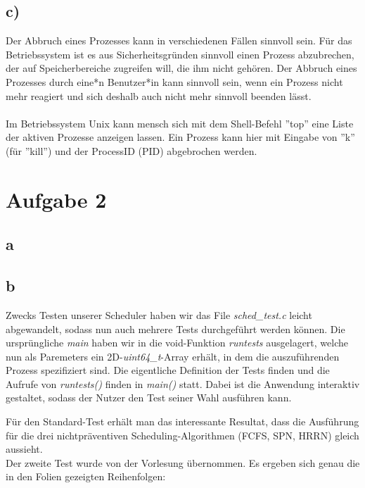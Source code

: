 \documentclass[numbers=noendperiod]{scrartcl}
\begin{document}
\subsection*{c)}
Der Abbruch eines Prozesses kann in verschiedenen Fällen sinnvoll sein. Für das Betriebssystem ist es aus Sicherheitsgründen sinnvoll einen Prozess abzubrechen, der auf Speicherbereiche zugreifen will, die ihm nicht gehören. Der Abbruch eines Prozesses durch eine*n Benutzer*in kann sinnvoll sein, wenn ein Prozess nicht mehr reagiert und sich deshalb auch nicht mehr sinnvoll beenden lässt. \\\\
Im Betriebssystem Unix kann mensch sich mit dem Shell-Befehl ''top'' eine Liste der aktiven Prozesse anzeigen lassen. Ein Prozess kann hier mit Eingabe von ''k'' (für ''kill'') und der ProcessID (PID) abgebrochen werden. 
\section{Aufgabe 2}
\subsection{a}


\subsection{b}

Zwecks Testen unserer Scheduler haben wir das File \textit{sched\_test.c} leicht abgewandelt, sodass nun auch mehrere Tests durchgeführt werden können. Die ursprüngliche \textit{main} haben wir in die void-Funktion \textit{runtests} ausgelagert, welche nun als Paremeters ein 2D-\textit{uint64\_t}-Array erhält, in dem die auszuführenden Prozess spezifiziert sind. Die eigentliche Definition der Tests finden und die Aufrufe von \textit{runtests()} finden in \textit{main()} statt. Dabei ist die Anwendung interaktiv gestaltet, sodass der Nutzer den Test seiner Wahl ausführen kann.


Für den Standard-Test erhält man das interessante Resultat, dass die Ausführung für die drei nichtpräventiven Scheduling-Algorithmen (FCFS, SPN, HRRN) gleich aussieht.\\

Der zweite Test wurde von der Vorlesung übernommen. Es ergeben sich genau die in den Folien gezeigten Reihenfolgen:\\
\end{document}
